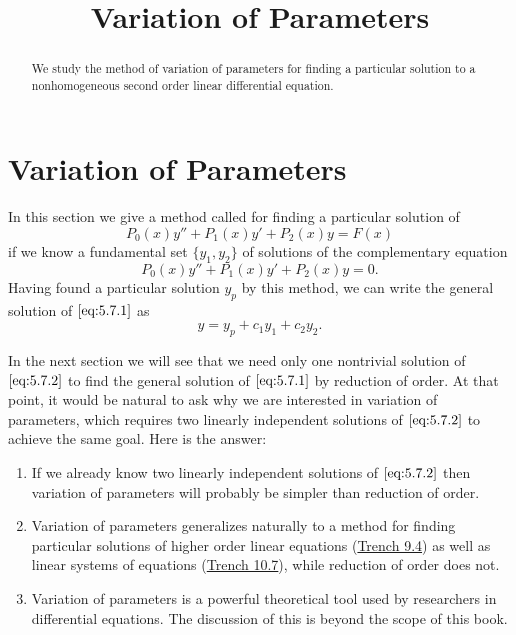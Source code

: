 \documentclass{ximera}
\title{Variation of Parameters}
\begin{document}
 
\begin{abstract}
 We study the method of variation of parameters for finding a particular solution to a nonhomogeneous second order linear differential equation.
\end{abstract}
 
\maketitle
 
\section*{Variation of Parameters}
 
In this section we give a method called  for finding a particular solution of
\begin{equation} \label{eq:5.7.1}
P_0(x)y''+P_1(x)y'+P_2(x)y=F(x)
\end{equation}
if we know a fundamental set $\{y_1,y_2\}$ of solutions of the
complementary equation
\begin{equation} \label{eq:5.7.2}
P_0(x)y''+P_1(x)y'+P_2(x)y=0.
\end{equation}
Having found a particular solution $y_p$ by this method, we can write
the general solution of $\eqref{eq:5.7.1}$ as
$$
y=y_p+c_1y_1+c_2y_2.
$$
 
In the next section we will see that we need only one nontrivial solution of $\eqref{eq:5.7.2}$ to find the general solution of $\eqref{eq:5.7.1}$ by reduction of order.  At that point, it would be natural to ask why we are interested in variation of parameters, which requires
two linearly independent solutions of $\eqref{eq:5.7.2}$ to achieve the same
goal. Here is the answer:
 
\begin{enumerate}
\item If we already know two linearly independent solutions of
$\eqref{eq:5.7.2}$ then variation of parameters will probably be simpler than reduction of order.
 
\item Variation of parameters generalizes naturally to a method
for finding particular solutions of higher order linear equations (\href{https://xerxes.ximera.org/differentialequations/main/varParHigherOrder/varParHigherOrder}{Trench 9.4}) as well as linear systems of
equations
(\href{https://xerxes.ximera.org/differentialequations/main/varParamNonHomLinSys/varParamNonHomLinSys}{Trench 10.7}), while reduction of order does not.
 
\item Variation of parameters is a powerful theoretical tool
 used by researchers in differential equations. The discussion of this is beyond the scope of this book.
  
 \end{enumerate}
 
\end{document}
